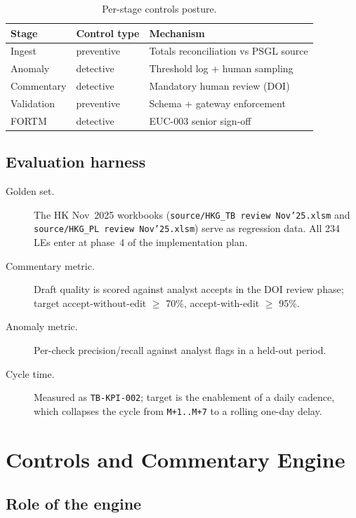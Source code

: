 \documentclass[11pt,a4paper,twoside]{report}
\newcommand{\corpus}{}
\begin{document}
\begin{table}[htbp]
\caption{Per-stage controls posture.}\label{tab:ai-controls}
\centering
\small
\begin{tabularx}{\linewidth}{@{}llX@{}}
\toprule
\textbf{Stage} & \textbf{Control type} & \textbf{Mechanism} \\ \midrule
Ingest        & preventive & Totals reconciliation vs PSGL source \\
Anomaly       & detective  & Threshold log + human sampling \\
Commentary    & detective  & Mandatory human review (DOI) \\
Validation    & preventive & Schema + gateway enforcement \\
FORTM         & detective  & EUC-003 senior sign-off \\
\bottomrule
\end{tabularx}
\end{table}

\section{Evaluation harness}

\begin{description}
\item[Golden set.] The HK Nov~2025 workbooks
(\corpus\texttt{source/HKG\_TB review Nov'25.xlsm} and
\corpus\texttt{source/HKG\_PL review Nov'25.xlsm}) serve as
regression data. All 234 LEs enter at phase~4 of the
implementation plan.
\item[Commentary metric.] Draft quality is scored against analyst
accepts in the DOI review phase; target accept-without-edit
$\ge$ 70\%, accept-with-edit $\ge$ 95\%.
\item[Anomaly metric.] Per-check precision/recall against analyst
flags in a held-out period.
\item[Cycle time.] Measured as \texttt{TB-KPI-002}; target is the
enablement of a daily cadence, which collapses the cycle from
\texttt{M+1..M+7} to a rolling one-day delay.
\end{description}
\chapter{Controls and Commentary Engine}\label{ch:controls-engine}

\section{Role of the engine}
\end{document}
